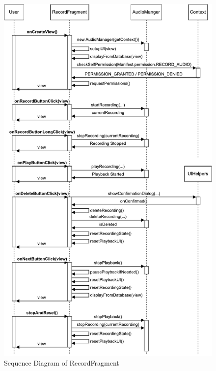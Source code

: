 \documentclass[conference,10pt,letterpaper]{IEEEtran}
\begin{document}
\begin{enumerate}
		\begin{figure}[htbp]
			\centerline{\includegraphics[width=\columnwidth]{src/record-sequence.pdf}}
			\caption{Sequence Diagram of RecordFragment}
			\label{fig:record_sequence}
		\end{figure}


\end{enumerate}
\end{document}
